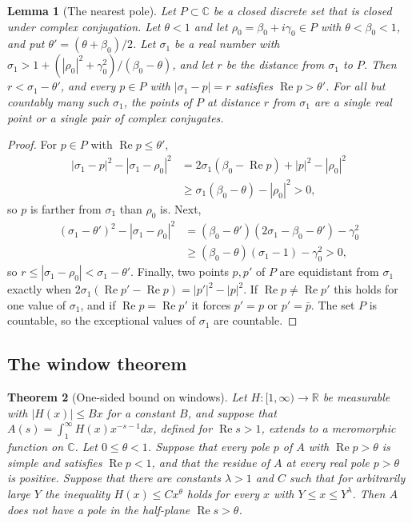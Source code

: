 \documentclass[11pt,letterpaper]{article}
\newtheorem{theorem}{Theorem}[section]
\newtheorem{lemma}[theorem]{Lemma}
\numberwithin{equation}{section}
\begin{document}
\begin{lemma}[The nearest pole]\label{near}
Let $P\subset\mathbb C$ be a closed discrete set that is closed under complex conjugation. Let $\theta<1$ and let $\rho_0=\beta_0+i\gamma_0\in P$ with $\theta<\beta_0<1$, and put $\theta'=(\theta+\beta_0)/2$. Let $\sigma_1$ be a real number with $\sigma_1>1+(|\rho_0|^2+\gamma_0^2)/(\beta_0-\theta)$, and let $r$ be the distance from $\sigma_1$ to $P$. Then $r<\sigma_1-\theta'$, and every $p\in P$ with $|\sigma_1-p|=r$ satisfies $\operatorname{Re}p>\theta'$. For all but countably many such $\sigma_1$, the points of $P$ at distance $r$ from $\sigma_1$ are a single real point or a single pair of complex conjugates.
\end{lemma}
\begin{proof}
For $p\in P$ with $\operatorname{Re}p\le\theta'$,
\begin{align*}
|\sigma_1-p|^2-|\sigma_1-\rho_0|^2&=2\sigma_1(\beta_0-\operatorname{Re}p)+|p|^2-|\rho_0|^2\\
&\ge\sigma_1(\beta_0-\theta)-|\rho_0|^2>0,
\end{align*}
so $p$ is farther from $\sigma_1$ than $\rho_0$ is. Next,
\begin{align*}
(\sigma_1-\theta')^2-|\sigma_1-\rho_0|^2&=(\beta_0-\theta')(2\sigma_1-\beta_0-\theta')-\gamma_0^2\\
&\ge(\beta_0-\theta)(\sigma_1-1)-\gamma_0^2>0,
\end{align*}
so $r\le|\sigma_1-\rho_0|<\sigma_1-\theta'$. Finally, two points $p,p'$ of $P$ are equidistant from $\sigma_1$ exactly when $2\sigma_1(\operatorname{Re}p'-\operatorname{Re}p)=|p'|^2-|p|^2$. If $\operatorname{Re}p\ne\operatorname{Re}p'$ this holds for one value of $\sigma_1$, and if $\operatorname{Re}p=\operatorname{Re}p'$ it forces $p'=p$ or $p'=\bar p$. The set $P$ is countable, so the exceptional values of $\sigma_1$ are countable.
\end{proof}

\subsection{The window theorem}\label{sec:win}

\begin{theorem}[One-sided bound on windows]\label{engine}
Let $H\colon[1,\infty)\to\mathbb R$ be measurable with $|H(x)|\le Bx$ for a constant $B$, and suppose that $A(s)=\int_1^\infty H(x)x^{-s-1}dx$, defined for $\operatorname{Re}s>1$, extends to a meromorphic function on $\mathbb C$. Let $0\le\theta<1$. Suppose that every pole $p$ of $A$ with $\operatorname{Re}p>\theta$ is simple and satisfies $\operatorname{Re}p<1$, and that the residue of $A$ at every real pole $p>\theta$ is positive. Suppose that there are constants $\lambda>1$ and $C$ such that for arbitrarily large $Y$ the inequality $H(x)\le Cx^\theta$ holds for every $x$ with $Y\le x\le Y^\lambda$. Then $A$ does not have a pole in the half-plane $\operatorname{Re}s>\theta$.
\end{theorem}
\end{document}
